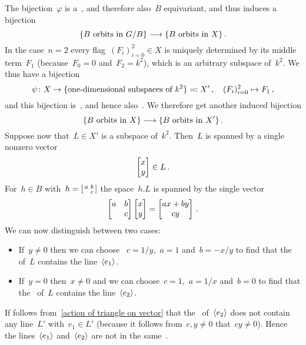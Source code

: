 \subsection{}

The bijection~$\varphi$ is a~, and therefore also~$B$ equivariant, and thus induces a bijection
\[
          \{\text{$B$ orbits in~$G/B$}\}
  \longrightarrow \{\text{$B$ orbits in~$X$}\} \,.
\]
In the case~$n = 2$ every flag~$(F_i)_{i=0}^2 \in X$ is uniquely determined by its middle term~$F_1$ (because~$F_0 = 0$ and~$F_2 = k^2$), which is an arbitrary  subspace of~$k^2$.
We thus have a bijection
\[
            \psi
  \colon    X
  \to       \{ \text{\dash{one}{dimensional} subspaces of~$k^2$} \}
  \defines  X'  \,,
  \quad     (F_i)_{i=0}^2
  \mapsto   F_1 \,,
\]
and this bijection is~, and hence also~.
We therefore get another induced bijection
\[
          \{\text{$B$ orbits in~$X$}\}
  \longrightarrow \{\text{$B$ orbits in~$X'$}\} \,.
\]
Suppose now that~$L \in X'$ is a  subspace of~$k^2$.
Then~$L$ is spanned by a single nonzero vector
\[
      \begin{bmatrix} x \\ y \end{bmatrix}
  \in L \,.
\]
For~$h \in B$ with~$h = \begin{bsmallmatrix} a & b \\ {} & c \end{bsmallmatrix}$ the space~$h.L$ is spanned by the single vector
\begin{equation}
  \label{action of triangle on vector}
  \begin{bmatrix}
    a   & b \\
    {}  & c
  \end{bmatrix}
  \begin{bmatrix} x \\ y \end{bmatrix}
  =
  \begin{bmatrix} ax + by \\ cy \end{bmatrix} \,.
\end{equation}
We can now distinguish between two cases:
\begin{itemize}
  \item
    If~$y \neq 0$ then we can choose ~$c = 1/y$,~$a = 1$ and~$b = -x/y$ to find that the~ of~$L$ contains the line~$\langle e_1\rangle$.
  \item
    If~$y = 0$ then~$x \neq 0$ and we can choose~$c = 1$,~$a = 1/x$ and~$b = 0$ to find that the~ of~$L$ contains the line~$\langle e_2\rangle$.
\end{itemize}
If follows from~\eqref{action of triangle on vector} that the~ of~$\langle e_2\rangle$ does not contain any line~$L'$ with~$e_1 \in L'$ (because it follows from~$c, y \neq 0$ that~$cy \neq 0$).
Hence the lines~$\langle e_1\rangle$ and~$\langle e_2\rangle$ are not in the same~.

